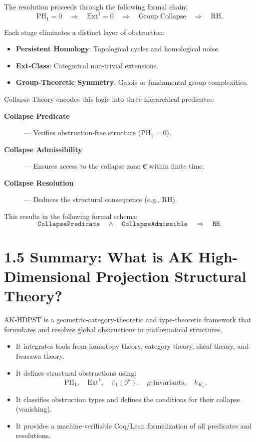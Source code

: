 \documentclass[11pt]{article}
\begin{document}
The resolution proceeds through the following formal chain:
\[
\mathrm{PH}_1 = 0 \quad \Rightarrow \quad \mathrm{Ext}^1 = 0 \quad \Rightarrow \quad \text{Group Collapse} \quad \Rightarrow \quad \text{RH}.
\]

Each stage eliminates a distinct layer of obstruction:
\begin{itemize}
  \item \textbf{Persistent Homology}: Topological cycles and homological noise.
  \item \textbf{Ext-Class}: Categorical non-trivial extensions.
  \item \textbf{Group-Theoretic Symmetry}: Galois or fundamental group complexities.
\end{itemize}

Collapse Theory encodes this logic into three hierarchical predicates:

\begin{description}
  \item[\textbf{Collapse Predicate}] — Verifies obstruction-free structure (\( \mathrm{PH}_1 = 0 \)).
  \item[\textbf{Collapse Admissibility}] — Ensures access to the collapse zone \( \mathfrak{C} \) within finite time.
  \item[\textbf{Collapse Resolution}] — Deduces the structural consequence (e.g., RH).
\end{description}

This results in the following formal schema:
\[
\texttt{CollapsePredicate} \quad \wedge \quad \texttt{CollapseAdmissible} \quad \Rightarrow \quad \texttt{RH}.
\]

\section*{1.5 Summary: What is AK High-Dimensional Projection Structural Theory?}

AK-HDPST is a geometric-category-theoretic and type-theoretic framework that formulates and resolves global obstructions in mathematical structures.

\begin{itemize}
  \item It integrates tools from homotopy theory, category theory, sheaf theory, and Iwasawa theory.
  \item It defines structural obstructions using:
    \[
    \mathrm{PH}_1, \quad \mathrm{Ext}^1, \quad \pi_1(\mathcal{F}), \quad \mu\text{-invariants}, \quad h_{K_n}.
    \]
  \item It classifies obstruction types and defines the conditions for their collapse (vanishing).
  \item It provides a machine-verifiable Coq/Lean formalization of all predicates and resolutions.
\end{itemize}
\end{document}
